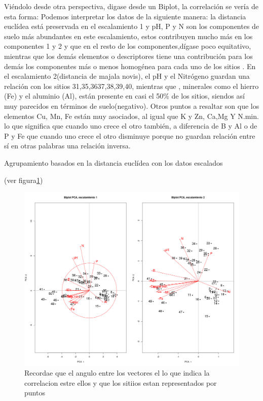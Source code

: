 \documentclass[11pt,]{article}
\begin{document}
Viéndolo desde otra perspectiva, digase desde un Biplot, la correlación
se vería de esta forma: Podemos interpretar los datos de la siguiente
manera: la distancia euclídea está preservada en el escalamiento 1 y pH,
P y N son los componentes de suelo más abundantes en este escalamiento,
estos contribuyen mucho más en los componentes 1 y 2 y que en el resto
de los componentes,dígase poco equitativo, mientras que los demás
elementos o descriptores tiene una contribución para los demás los
componentes más o menos homogénea para cada uno de los sitios . En el
escalamiento 2(distancia de majala novis), el pH y el Nitrógeno guardan
una relación con los sitios 31,35,3637,38,39,40, mientras que ,
minerales como el hierro (Fe) y el aluminio (Al), están presente en casi
el 50\% de los sitios, siendos así muy parecidos en términos de
suelo(negativo). Otros puntos a resaltar son que los elementos Cu, Mn,
Fe están muy asociados, al igual que K y Zn, Ca,Mg Y N.min. lo que
significa que cuando uno crece el otro también, a diferencia de B y Al o
de P y Fe que cuando uno crece el otro disminuye porque no guardan
relación entre sí en otras palabras una relación inversa.

Agrupamiento basados en la distancia euclídea con los datos escalados

(ver figura\ref{fig:Biplot_pca1_pca2})

\begin{figure}
\centering
\includegraphics{Biplot_pca1_pca2.png}
\caption{\label{fig:Biplot_pca1_pca2}Recordae que el angulo entre los
vectores el lo que indica la correlacion estre ellos y que los sitiios
estan representados por puntos}
\end{figure}
\end{document}
